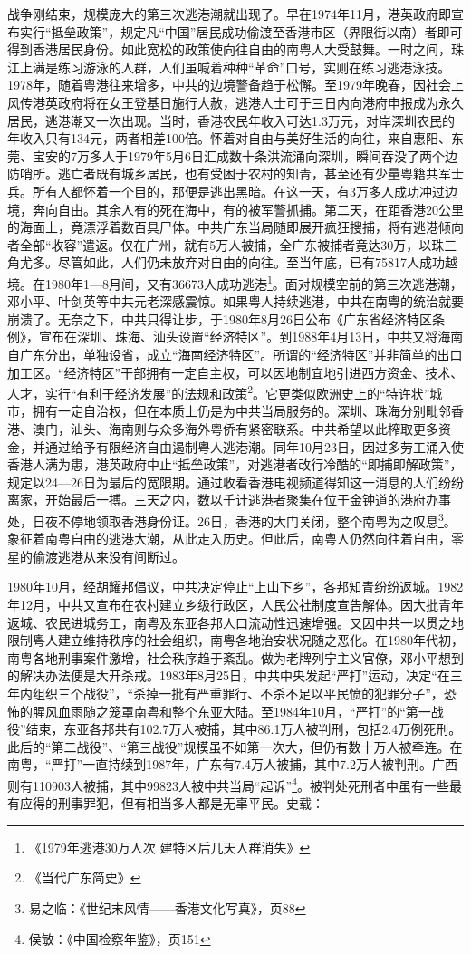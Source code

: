 战争刚结束，规模庞大的第三次逃港潮就出现了。早在1974年11月，港英政府即宣布实行“抵垒政策”，规定凡“中国”居民成功偷渡至香港市区（界限街以南）者即可得到香港居民身份。如此宽松的政策使向往自由的南粤人大受鼓舞。一时之间，珠江上满是练习游泳的人群，人们虽喊着种种“革命”口号，实则在练习逃港泳技。1978年，随着粤港往来增多，中共的边境警备趋于松懈。至1979年晚春，因社会上风传港英政府将在女王登基日施行大赦，逃港人士可于三日内向港府申报成为永久居民，逃港潮又一次出现。当时，香港农民年收入可达1.3万元，对岸深圳农民的年收入只有134元，两者相差100倍。怀着对自由与美好生活的向往，来自惠阳、东莞、宝安的7万多人于1979年5月6日汇成数十条洪流涌向深圳，瞬间吞没了两个边防哨所。逃亡者既有城乡居民，也有受困于农村的知青，甚至还有少量粤籍共军士兵。所有人都怀着一个目的，那便是逃出黑暗。在这一天，有3万多人成功冲过边境，奔向自由。其余人有的死在海中，有的被军警抓捕。第二天，在距香港20公里的海面上，竟漂浮着数百具尸体。中共广东当局随即展开疯狂搜捕，将有逃港倾向者全部“收容”遣返。仅在广州，就有5万人被捕，全广东被捕者竟达30万，以珠三角尤多。尽管如此，人们仍未放弃对自由的向往。至当年底，已有75817人成功越境。在1980年1—8月间，又有36673人成功逃港\footnote{《1979年逃港30万人次 建特区后几天人群消失》}。面对规模空前的第三次逃港潮，邓小平、叶剑英等中共元老深感震惊。如果粤人持续逃港，中共在南粤的统治就要崩溃了。无奈之下，中共只得让步，于1980年8月26日公布《广东省经济特区条例》，宣布在深圳、珠海、汕头设置“经济特区”。到1988年4月13日，中共又将海南自广东分出，单独设省，成立“海南经济特区”。所谓的“经济特区”并非简单的出口加工区。“经济特区”干部拥有一定自主权，可以因地制宜地引进西方资金、技术、人才，实行“有利于经济发展”的法规和政策\footnote{《当代广东简史》}。它更类似欧洲史上的“特许状”城市，拥有一定自治权，但在本质上仍是为中共当局服务的。深圳、珠海分别毗邻香港、澳门，汕头、海南则与众多海外粤侨有紧密联系。中共希望以此榨取更多资金，并通过给予有限经济自由遏制粤人逃港潮。同年10月23日，因过多劳工涌入使香港人满为患，港英政府中止“抵垒政策”，对逃港者改行冷酷的“即捕即解政策”，规定以24—26日为最后的宽限期。通过收看香港电视频道得知这一消息的人们纷纷离家，开始最后一搏。三天之内，数以千计逃港者聚集在位于金钟道的港府办事处，日夜不停地领取香港身份证。26日，香港的大门关闭，整个南粤为之叹息\footnote{易之临：《世纪末风情——香港文化写真》，页88}。象征着南粤自由的逃港大潮，从此走入历史。但此后，南粤人仍然向往着自由，零星的偷渡逃港从来没有间断过。

1980年10月，经胡耀邦倡议，中共决定停止“上山下乡”，各邦知青纷纷返城。1982年12月，中共又宣布在农村建立乡级行政区，人民公社制度宣告解体。因大批青年返城、农民进城务工，南粤及东亚各邦人口流动性迅速增强。又因中共一以贯之地限制粤人建立维持秩序的社会组织，南粤各地治安状况随之恶化。在1980年代初，南粤各地刑事案件激增，社会秩序趋于紊乱。做为老牌列宁主义官僚，邓小平想到的解决办法便是大开杀戒。1983年8月25日，中共中央发起“严打”运动，决定“在三年内组织三个战役”，“杀掉一批有严重罪行、不杀不足以平民愤的犯罪分子”，恐怖的腥风血雨随之笼罩南粤和整个东亚大陆。至1984年10月，“严打”的“第一战役”结束，东亚各邦共有102.7万人被捕，其中86.1万人被判刑，包括2.4万例死刑。此后的“第二战役”、“第三战役”规模虽不如第一次大，但仍有数十万人被牵连。在南粤，“严打”一直持续到1987年，广东有7.4万人被捕，其中7.2万人被判刑。广西则有110903人被捕，其中99823人被中共当局“起诉”\footnote{侯敏：《中国检察年鉴》，页151}。被判处死刑者中虽有一些最有应得的刑事罪犯，但有相当多人都是无辜平民。史载：

